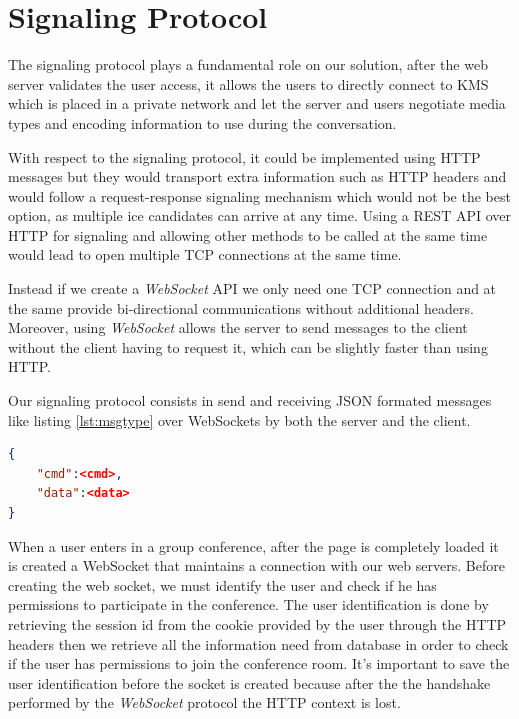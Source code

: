 \section{Signaling Protocol}

The signaling protocol plays a fundamental role on our solution, after the web server validates the user access,
it allows the users to directly connect to \ac{KMS} which is placed in a private network and let the server and users negotiate media types and encoding information to use during the conversation.

With respect to the signaling protocol, it could be implemented using \ac{HTTP} messages but they would transport extra information such as \ac{HTTP} headers and would follow a request-response signaling mechanism which would not be the best option, as multiple ice candidates can arrive at any time. Using a \ac{REST} \ac{API} over \ac{HTTP} for signaling and allowing other methods to be called at the same time would lead to open multiple \ac{TCP} connections at the same time.

Instead if we create a \emph{WebSocket} \ac{API} we only need one \ac{TCP} connection and at the same provide bi-directional communications without additional headers. Moreover, using \emph{WebSocket} allows the server to send messages to the client without the client having to request it, which can be slightly faster than using \ac{HTTP}.

Our signaling protocol consists in send and receiving \ac{JSON} formated messages like listing \ref{lst:msgtype} over WebSockets by both the server and the client. 

\begin{minipage}{\linewidth}
\begin{lstlisting}[caption={General structure of our WebSocket messages},label={lst:msgtype},language=json]
{
	"cmd":<cmd>,
	"data":<data>
}
\end{lstlisting}
\end{minipage}

When a user enters in a group conference, after the page is completely loaded it is created a WebSocket that maintains a connection with our web servers. 
Before creating the web socket, we must identify the user and check if he has permissions to participate in the conference. The user identification is done by retrieving the session id from the cookie provided by the user through the \ac{HTTP} headers then we retrieve all the information need from database in order to check if the user has permissions to join the conference room. It's important to save the user identification before the socket is created because after the the handshake performed by the \emph{WebSocket} protocol\cite{rfc6455} the \ac{HTTP} context is lost.

